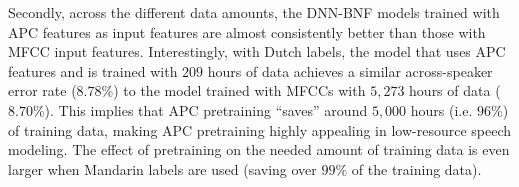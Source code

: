 \documentclass[a4paper]{article}
\begin{document}
Secondly, across the different data amounts, the DNN-BNF models trained with APC features as input features are almost consistently better than those with MFCC input features. 
Interestingly, 
with Dutch labels,
the model that uses APC features and is trained with $209$ hours of data achieves a similar across-speaker error rate ($8.78\%$) to the model trained with MFCCs with $5,273$ hours of data ($8.70\%$). This implies that APC pretraining ``saves'' around $5,000$ hours (i.e.  $96\%$) of training data, making APC pretraining highly appealing in low-resource speech modeling. The effect of pretraining on the needed amount of training data is even larger when Mandarin labels are used 
(saving over $99\%$ of the training data).






\end{document}
